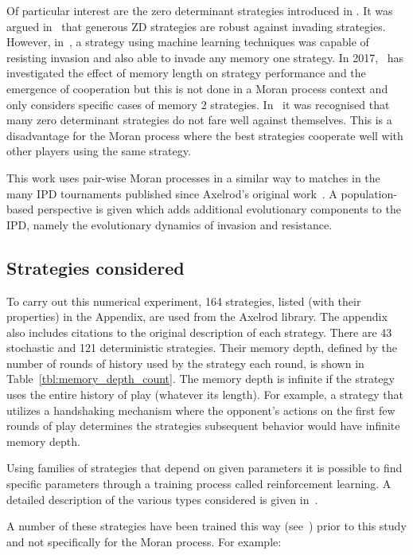 \documentclass[10pt,letterpaper]{article}
\begin{document}
Of particular interest are the zero determinant strategies introduced in
\cite{Press2012}. It was argued in~\cite{stewart2013extortion} that generous
ZD strategies are robust against invading strategies. However, in~\cite{Lee2015},
a strategy using machine learning techniques was capable of resisting invasion
and also able to invade any memory one strategy. In 2017,~\cite{Hilbe2017}
has investigated the effect of memory length on strategy performance and the
emergence of cooperation but this is not done in a Moran process context and only
considers specific cases of memory 2 strategies. In~\cite{Adami2013} it was
recognised that many zero determinant strategies do not fare well against
themselves. This is a disadvantage for the Moran process where the best
strategies cooperate well with other players using the same strategy.

This work uses pair-wise Moran processes in a similar way to matches in the many
IPD tournaments published since Axelrod's original work~\cite{Axelrod1980a}.
A population-based perspective is given which adds additional
evolutionary components to the IPD, namely the evolutionary dynamics of invasion
and resistance.

\subsection*{Strategies considered}\label{sec:strategies}

To carry out this numerical experiment, 164
strategies, listed (with their properties) in the Appendix,
are used from the Axelrod library. The appendix also includes citations to the
original description of each strategy. There are
43 stochastic and
121 deterministic strategies. Their memory depth,
defined by the number of rounds of history used by the strategy each round, is
shown in Table~\ref{tbl:memory_depth_count}. The memory depth is infinite if the
strategy uses the entire history of play (whatever its length). For example, a
strategy that utilizes a handshaking mechanism where the opponent's actions on
the first few rounds of play determines the strategies subsequent behavior would
have infinite memory depth.

Using families of strategies that depend on given parameters it is possible to
find specific parameters through a training process called reinforcement
learning. A detailed description of the various types considered is given
in~\cite{Harper2017}.

A number of these strategies have been trained this way (see~\cite{Harper2017})
prior to this study and not specifically for the Moran process. For example:
\end{document}
